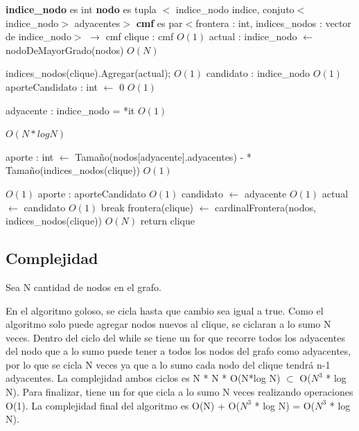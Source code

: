 \documentclass[a4paper, 10pt, twoside]{article}
\newenvironment{pseudo}[1][]{%
    \vspace{1em}%
    \begin{algorithmic}%
}
{%
    \end{algorithmic}%
    \vspace{1em}%
}
\newcommand{\Ode}[1]{\hfill $O(#1)$}
\begin{document}
\begin{pseudo}
\State \textbf{indice\_nodo} es int
\State \textbf{nodo} es tupla $<$ indice\_nodo indice, conjuto$<$indice\_nodo$>$ adyacentes$>$
\State \textbf{cmf} es par$<$frontera : int, indices\_nodos : vector de indice\_nodo$>$
\State
{} $\rightarrow$ cmf
	\State clique : cmf														\Ode{1}
	\State actual : indice\_nodo $\leftarrow$ nodoDeMayorGrado(nodos)		\Ode{N}

	 	\State indices\_nodos(clique).Agregar(actual);						\Ode{1}
	 	\State candidato : indice\_nodo										\Ode{1}
		\State aporteCandidato : int $\leftarrow$ 0							\Ode{1}


	 		\State adyacente : indice\_nodo = *it							\Ode{1}
	 		
	 					\Ode{N*log N}

	 			\State aporte : int $\leftarrow$ Tamaño(nodos[adyacente].adyacentes) -
	 				 * Tamaño(indices\_nodos(clique))				\Ode{1}

	 											\Ode{1}
	 				\State aporte : aporteCandidato							\Ode{1}
	 				\State candidato $\leftarrow$ adyacente					\Ode{1}
	 			\EndIf
	 		\EndIf
	 	\EndFor
	 	\State
	 	 actual $\leftarrow$ candidato			\Ode{1}
	 	\Else
	 		\State break
	 	\EndIf
	\EndWhile
	\State
	\State frontera(clique) $\leftarrow$ cardinalFrontera(nodos, indices\_nodos(clique)) \Ode{N}
	\State return clique
\EndProcedure
\end{pseudo}

\subsection{Complejidad}
Sea N cantidad de nodos en el grafo.

En el algoritmo goloso, se cicla hasta que cambio sea igual a true. Como el algoritmo solo puede agregar nodos nuevos al clique, se ciclaran a lo sumo N veces.
Dentro del ciclo del while se tiene un for que recorre todos los adyacentes del nodo que a lo sumo puede tener a todos los nodos del grafo como adyacentes, por lo que se cicla N veces ya que a lo sumo cada nodo del clique tendrá n-1 adyacentes.
La complejidad ambos ciclos es N * N * O(N*log N) $\subset$ O($N^3$ * log N).
Para finalizar, tiene un for que cicla a lo sumo N veces realizando operaciones O(1).
La complejidad final del algoritmo es O(N) + O($N^3$ * log N) = O($N^3$ * log N).
\end{document}
